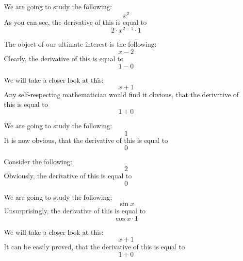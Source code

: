 \documentclass{article}
\begin{document}
We are going to study the following:
\begin{equation}
x ^{2 } 
\end{equation}
As you can see, the derivative of this is equal to
\begin{equation}
2 \cdot x ^{2 - 1 } \cdot 1 
\end{equation}

The object of our ultimate interest is the following:
\begin{equation}
x - 2 
\end{equation}
Clearly, the derivative of this is equal to
\begin{equation}
1 - 0 
\end{equation}

We will take a closer look at this:
\begin{equation}
x + 1 
\end{equation}
Any self-respecting mathematician would find it obvious, that the derivative of this is equal to
\begin{equation}
1 + 0 
\end{equation}

We are going to study the following:
\begin{equation}
1 
\end{equation}
It is now obvious, that the derivative of this is equal to
\begin{equation}
0 
\end{equation}

Consider the following:
\begin{equation}
2 
\end{equation}
Obviously, the derivative of this is equal to
\begin{equation}
0 
\end{equation}

We are going to study the following:
\begin{equation}
\sin x 
\end{equation}
Unsurprisingly, the derivative of this is equal to
\begin{equation}
\cos x \cdot 1 
\end{equation}

We will take a closer look at this:
\begin{equation}
x + 1 
\end{equation}
It can be easily proved, that the derivative of this is equal to
\begin{equation}
1 + 0 
\end{equation}
\end{document}
